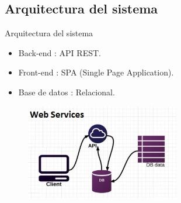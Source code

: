 \documentclass{beamer}
\begin{document}
\subsection{Arquitectura del sistema}

	\begin{frame}{Arquitectura del sistema}
		\begin{itemize}
			\item {
				Back-end : API REST.
				
			}
			\item {
				Front-end : SPA (Single Page Application).
			}
			\item {
				Base de datos : Relacional.
				
			}
		\end{itemize}
		
		
		\begin{figure}[h]
    		\centering
    		\includegraphics[width=0.6\textwidth, height=0.4\textheight]{images_latex/rest-api}


\end{figure}
\end{frame}
\end{document}
